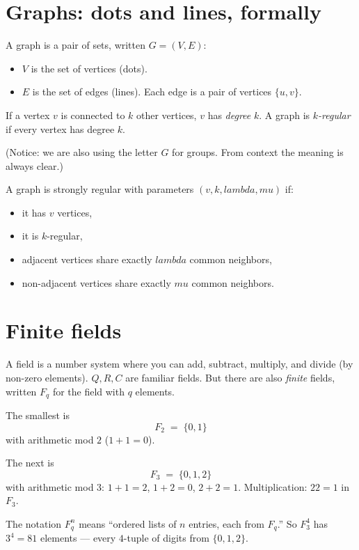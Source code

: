 \documentclass[11pt]{article}
\def\mathbb#1{#1}%
\def\textbf#1{#1}%
\def\lambda{lambda}%
\def\mu{mu}%
\def\cdot{ }%
\begin{document}
\section{Graphs: dots and lines, formally}

\begin{mathnote}
A \textbf{graph} is a pair of sets, written $G = (V, E)$:
\begin{itemize}[leftmargin=2em]
\item $V$ is the set of vertices (dots).
\item $E$ is the set of edges (lines). Each edge is a pair of vertices $\{u, v\}$.
\end{itemize}
If a vertex $v$ is connected to $k$ other vertices, $v$ has \emph{degree} $k$. A graph is \emph{$k$-regular} if every vertex has degree $k$.

(Notice: we are also using the letter $G$ for groups. From context the meaning is always clear.)
\end{mathnote}

A graph is \textbf{strongly regular} with parameters $(v, k, \lambda, \mu)$ if:
\begin{itemize}[leftmargin=2em]
\item it has $v$ vertices,
\item it is $k$-regular,
\item adjacent vertices share exactly $\lambda$ common neighbors,
\item non-adjacent vertices share exactly $\mu$ common neighbors.
\end{itemize}

\section{Finite fields}

\begin{mathnote}
A \textbf{field} is a number system where you can add, subtract, multiply, and divide (by non-zero elements). $\mathbb{Q}, \mathbb{R}, \mathbb{C}$ are familiar fields. But there are also \emph{finite} fields, written $\mathbb{F}_q$ for the field with $q$ elements.

The smallest is
\[
\mathbb{F}_2 \;=\; \{0, 1\}
\]
with arithmetic mod $2$ ($1 + 1 = 0$).

The next is
\[
\mathbb{F}_3 \;=\; \{0, 1, 2\}
\]
with arithmetic mod $3$: $1 + 1 = 2$, $1 + 2 = 0$, $2 + 2 = 1$. Multiplication: $2 \cdot 2 = 1$ in $\mathbb{F}_3$.

The notation $\mathbb{F}_q^n$ means ``ordered lists of $n$ entries, each from $\mathbb{F}_q$.'' So $\mathbb{F}_3^4$ has $3^4 = 81$ elements --- every $4$-tuple of digits from $\{0, 1, 2\}$.
\end{mathnote}
\end{document}
